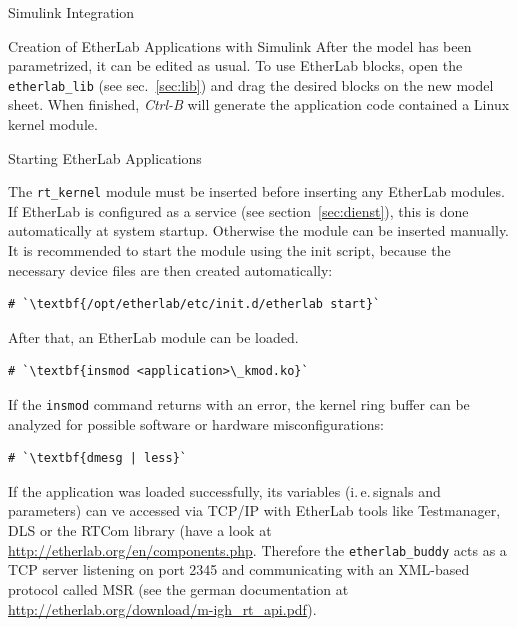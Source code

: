 \begin{ighsec}{Simulink Integration}
\begin{ighsec}{Creation of EtherLab Applications with Simulink}
After the model has been parametrized, it can be edited as usual. To use
EtherLab blocks, open the \texttt{etherlab\_lib} (see sec.~\ref{sec:lib}) and
drag the desired blocks on the new model sheet. When finished, \textit{Ctrl-B}
will generate the application code contained a Linux kernel module.

\end{ighsec}


\end{ighsec} %


\begin{ighsec}{Starting EtherLab Applications}
\label{sec:start}

The \texttt{rt\_kernel} module must be inserted before inserting any EtherLab
modules. If EtherLab is configured as a service (see
section~\ref{sec:dienst}), this is done automatically at system startup.
Otherwise the module can be inserted manually. It is recommended to start the
module using the init script, because the necessary device files are then
created automatically:

\begin{lstlisting}[gobble=2]
  # `\textbf{/opt/etherlab/etc/init.d/etherlab start}`
\end{lstlisting}

After that, an EtherLab module can be loaded.

\begin{lstlisting}[gobble=2]
  # `\textbf{insmod <application>\_kmod.ko}`
\end{lstlisting}

If the \texttt{insmod} command returns with an error, the kernel ring
buffer can be analyzed for possible software or hardware
misconfigurations:

\begin{lstlisting}[gobble=2]
  # `\textbf{dmesg | less}`
\end{lstlisting}

If the application was loaded successfully, its variables (i.\,e.\,signals
and parameters) can ve accessed via TCP/IP with EtherLab tools like
Testmanager, DLS or the RTCom library (have a look at
\url{http://etherlab.org/en/components.php}. Therefore the
\texttt{etherlab\_buddy} acts as a TCP server listening on port 2345 and
communicating with an XML-based protocol called MSR (see the german
documentation at \url{http://etherlab.org/download/m-igh_rt_api.pdf}).

\end{ighsec}

